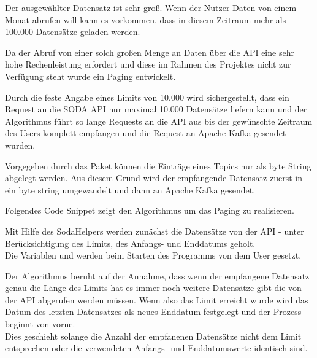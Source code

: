 Der ausgewählter Datensatz ist sehr groß.
Wenn \zb{} der Nutzer Daten von einem Monat abrufen will kann es vorkommen,
dass in diesem Zeitraum mehr als 100.000 Datensätze geladen werden.

Da der Abruf von einer solch großen Menge an Daten über die API eine sehr hohe Rechenleistung erfordert und diese im Rahmen des Projektes nicht zur Verfügung steht wurde
ein Paging entwickelt.

Durch die feste Angabe eines Limits von 10.000 wird sichergestellt, dass ein Request an die \ac{SODA} \ac{API} nur maximal 10.000
Datensätze liefern kann und der Algorithmus führt so lange Requests an die \ac{API} aus bis der gewünschte Zeitraum des Users komplett empfangen und
die Request an Apache Kafka gesendet wurden.

Vorgegeben durch das Paket  können die Einträge eines Topics nur als byte String abgelegt werden.
Aus diesem Grund wird der empfangende Datensatz zuerst in ein byte string umgewandelt und dann an Apache Kafka gesendet.

Folgendes Code Snippet zeigt den Algorithmus um das Paging zu realisieren.

Mit Hilfe des SodaHelpers werden zunächst die Datensätze von der \ac{API} - unter Berücksichtigung des Limits, des Anfangs- und Enddatums geholt.
\\
Die Variablen  und  werden beim Starten des Programms von dem User gesetzt.

Der Algorithmus beruht auf der Annahme, dass wenn der empfangene Datensatz genau die Länge des Limits hat es immer noch weitere Datensätze gibt die von der \ac{API} abgerufen werden müssen.
Wenn also das Limit erreicht wurde wird das Datum des letzten Datensatzes als neues Enddatum festgelegt und der Prozess beginnt von vorne.
\\
Dies geschieht solange die Anzahl der empfanenen Datensätze nicht dem Limit entsprechen
oder die verwendeten Anfangs- und Enddatumswerte identisch sind.


